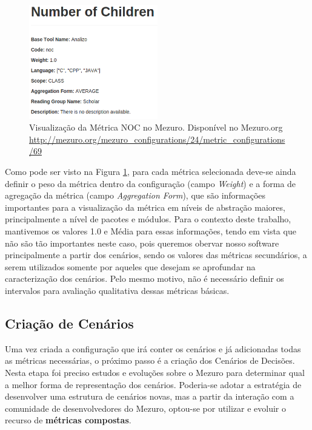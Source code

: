 \graphicspath{{figuras/}}
\begin{figure}[h]
\centering
\includegraphics[width=0.5\textwidth]{metric_example}
\caption{Visualização da Métrica NOC no Mezuro. Disponível no Mezuro.org \url{http://mezuro.org/mezuro_configurations/24/metric_configurations/69}}
\label{metric_example}
\end{figure}

Como pode ser visto na Figura \ref{metric_example}, para cada métrica selecionada deve-se ainda definir o peso da métrica dentro da configuração (campo \emph{Weight}) e a forma de agregação da métrica (campo \emph{Aggregation Form}), que são informações importantes para a visualização da métrica em níveis de abstração maiores, principalmente a nível de pacotes e módulos. Para o contexto deste trabalho, mantivemos os valores 1.0 e Média para essas informações, tendo em vista que não são tão importantes neste caso, pois queremos obervar nosso software principalmente a partir dos cenários, sendo os valores das métricas secundários, a serem utilizados somente por aqueles que desejam se aprofundar na caracterização dos cenários. Pelo mesmo motivo, não é necessário definir os intervalos para avaliação qualitativa dessas métricas básicas.

\subsection{Criação de Cenários}

Uma vez criada a configuração que irá conter os cenários e já adicionadas todas as métricas necessárias, o próximo passo é a criação dos Cenários de Decisões. Nesta etapa foi preciso estudos e evoluções sobre o Mezuro para determinar qual a melhor forma de representação dos cenários. Poderia-se adotar a estratégia de desenvolver uma estrutura de cenários novas, mas a partir da interação com a comunidade de desenvolvedores do Mezuro, optou-se por utilizar e evoluir o recurso de \textbf{métricas compostas}.

